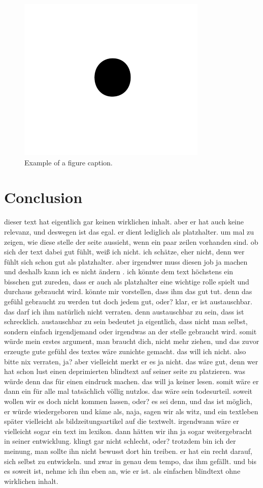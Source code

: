 \documentclass[conference]{IEEEtran}
\begin{document}
\begin{figure}[htbp]
\centerline{\includegraphics{fig1.png}}
\caption{Example of a figure caption.}
\label{fig}
\end{figure}


\section{Conclusion}
dieser text hat eigentlich gar keinen wirklichen inhalt. aber er hat auch keine relevanz, und deswegen ist das egal. er dient lediglich als platzhalter. um mal zu zeigen, wie diese stelle der seite aussieht, wenn ein paar zeilen vorhanden sind. ob sich der text dabei gut fühlt, weiß ich nicht. ich schätze, eher nicht, denn wer fühlt sich schon gut als platzhalter. aber irgendwer muss diesen job ja machen und deshalb kann ich es nicht ändern . ich könnte dem text höchstens ein bisschen gut zureden, dass er auch als platzhalter eine wichtige rolle spielt und durchaus gebraucht wird. könnte mir vorstellen, dass ihm das gut tut. denn das gefühl gebraucht zu werden tut doch jedem gut, oder? klar, er ist austauschbar. das darf ich ihm natürlich nicht verraten. denn austauschbar zu sein, dass ist schrecklich. austauschbar zu sein bedeutet ja eigentlich, dass nicht man selbst, sondern einfach irgendjemand oder irgendwas an der stelle gebraucht wird. somit würde mein erstes argument, man braucht dich, nicht mehr ziehen, und das zuvor erzeugte gute gefühl des textes wäre zunichte gemacht. das will ich nicht. also bitte nix verraten, ja? aber vielleicht merkt er es ja nicht. das wäre gut, denn wer hat schon lust einen deprimierten blindtext auf seiner seite zu platzieren. was würde denn das für einen eindruck machen. das will ja keiner lesen. somit wäre er dann ein für alle mal tatsächlich völlig nutzlos. das wäre sein todesurteil. soweit wollen wir es doch nicht kommen lassen, oder? es sei denn, und das ist möglich, er würde wiedergeboren und käme als, naja, sagen wir als witz, und ein textleben später vielleicht als bildzeitungsartikel auf die textwelt. irgendwann wäre er vielleicht sogar ein text im lexikon. dann hätten wir ihn ja sogar weitergebracht in seiner entwicklung. klingt gar nicht schlecht, oder? trotzdem bin ich der meinung, man sollte ihn nicht bewusst dort hin treiben. er hat ein recht darauf, sich selbst zu entwickeln. und zwar in genau dem tempo, das ihm gefällt. und bis es soweit ist, nehme ich ihn eben an, wie er ist. als einfachen blindtext ohne wirklichen inhalt.
\end{document}
